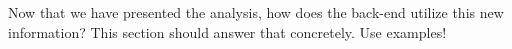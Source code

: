 Now that we have presented the analysis, how does the back-end utilize this new information?
This section should answer that concretely.
Use examples!

